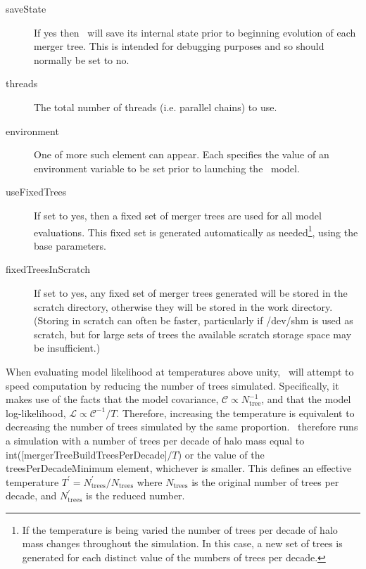 \begin{description}
\item[{\normalfont \ttfamily saveState}] If {\normalfont \ttfamily yes} then \glc\ will save its internal state prior to beginning evolution of each merger tree. This is intended for debugging purposes and so should normally be set to {\normalfont \ttfamily no}.
\item[{\normalfont \ttfamily threads}] The total number of threads (i.e. parallel chains) to use.
\item[{\normalfont \ttfamily environment}] One of more such element can appear. Each specifies the value of an environment variable to be set prior to launching the \glc\ model.
\item[{\normalfont \ttfamily useFixedTrees}] If set to {\normalfont \ttfamily yes}, then a fixed set of merger trees are used for all model evaluations. This fixed set is generated automatically as needed\footnote{If the temperature is being varied the number of trees per decade of halo mass changes throughout the simulation. In this case, a new set of trees is generated for each distinct value of the numbers of trees per decade.}, using the base parameters.
\item[{\normalfont \ttfamily fixedTreesInScratch}] If set to {\normalfont \ttfamily yes}, any fixed set of merger trees generated will be stored in the scratch directory, otherwise they will be stored in the work directory. (Storing in scratch can often be faster, particularly if {\normalfont \ttfamily /dev/shm} is used as scratch, but for large sets of trees the available scratch storage space may be insufficient.)
\end{description}

When evaluating model likelihood at temperatures above unity, \glc\ will attempt to speed computation by reducing the number of trees simulated. Specifically, it makes use of the facts that the model covariance, $\mathcal{C} \propto N_\mathrm{tree}^{-1}$, and that the model log-likelihood, $\mathcal{L} \propto \mathcal{C}^{-1}/T$. Therefore, increasing the temperature is equivalent to decreasing the number of trees simulated by the same proportion. \glc\ therefore runs a simulation with a number of trees per decade of halo mass equal to {\normalfont \ttfamily int([mergerTreeBuildTreesPerDecade]}$/T${\normalfont \ttfamily )} or the value of the {\normalfont \ttfamily treesPerDecadeMinimum} element, whichever is smaller. This defines an effective temperature $T^\prime=N_\mathrm{trees}^\prime/N_\mathrm{trees}$ where $N_\mathrm{trees}$ is the original number of trees per decade, and $N_\mathrm{trees}^\prime$ is the reduced number.

